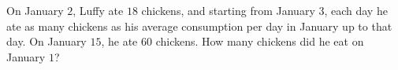 On January $2$, Luffy ate $18$ chickens, and starting from January $3$, each day he ate as many chickens as his average consumption per day in January up to that day. On January $15$, he ate $60$ chickens. How many chickens did he eat on January $1$?
